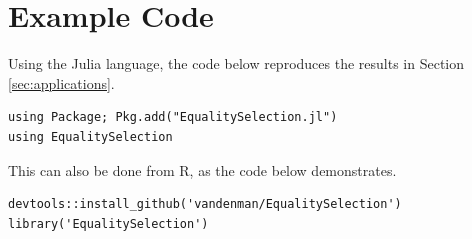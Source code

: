 \documentclass[11pt,a4paper]{article}
\theoremstyle{definition} %
\theoremstyle{case}
\newcommand{\FD}[1]{\textcolor{red}{Fabian: #1 }}
\begin{document}

\printbibliography

\newpage
\appendix

\section{Example Code} \label{sec:appendix-code}
Using the Julia language, the code below reproduces the results in Section \ref{sec:applications}.

\begin{verbatim}
using Package; Pkg.add("EqualitySelection.jl")
using EqualitySelection
\end{verbatim}

\noindent This can also be done from R, as the code below demonstrates.

\begin{verbatim}
devtools::install_github('vandenman/EqualitySelection')
library('EqualitySelection')
\end{verbatim}
\end{document}
